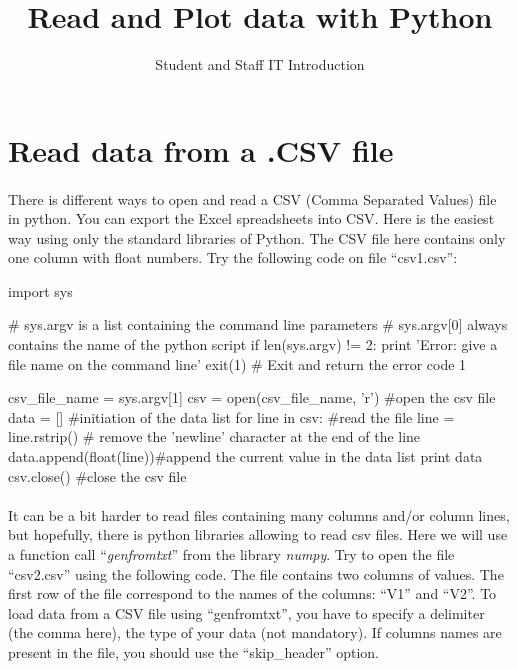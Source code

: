 \documentclass[article,10pt]{scrartcl}
\begin{document}
\title{Read and Plot data with Python}
\subtitle{Student and Staff IT Introduction}
\maketitle

\section{Read data from a .CSV file}

\paragraph{}
There is different ways to open and read a CSV (Comma Separated Values) file in python. You can export the Excel spreadsheets into CSV. Here is the easiest way using only the standard libraries of Python.
The CSV file here contains only one column with float numbers. Try the following code on file ``csv1.csv'':

\begin{python}
import sys

# sys.argv is a list containing the command line parameters
# sys.argv[0] always contains the name of the python script
if len(sys.argv) != 2:
   print 'Error: give a file name on the command line'
   exit(1) # Exit and return the error code 1

csv_file_name = sys.argv[1]
csv = open(csv_file_name, 'r') #open the csv file
data = [] #initiation of the data list
for line in csv: #read the file
   line = line.rstrip() # remove the 'newline' character at the end of the line
   data.append(float(line))#append the current value in the data list
print data
csv.close() #close the csv file
\end{python}

\paragraph{}
It can be a bit harder to read files containing many columns and/or column lines, but hopefully, there is python libraries allowing to read csv files. Here we will use a function call ``\emph{genfromtxt}'' from the library \emph{numpy}. Try to open the file ``csv2.csv'' using the following code. The file contains two columns of values. The first row of the file correspond to the names of the columns: ``V1'' and ``V2''. To load data from a CSV file using ``genfromtxt'', you have to specify a delimiter (the comma here), the type of your data (not mandatory). If columns names are present in the file, you should use the ``skip\_header'' option.
\end{document}
